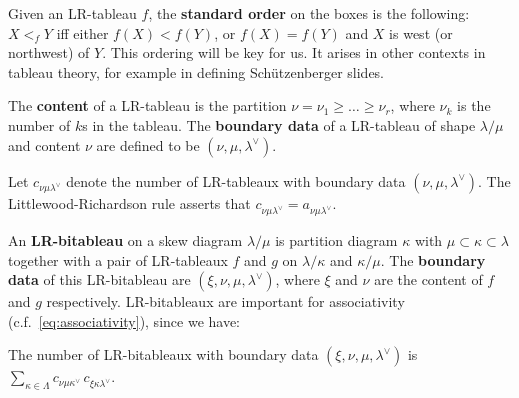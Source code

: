 Given an LR-tableau $f$, the {\bf standard order} on the boxes is the 
following: $X <_f Y$ iff either $f(X) < f(Y)$, or $f(X) = f(Y)$ and $X$
is west (or northwest) of $Y$.  This ordering will be key for us.  It
arises in other contexts in tableau theory, for example in
defining Sch\"utzenberger slides.

The {\bf content} of a LR-tableau is the partition $\nu = \nu_1 \geq \dots 
\geq \nu_r$, where $\nu_k$
is the number of $k$s in the tableau.  The {\bf boundary data} of
a LR-tableau of shape $\lambda/\mu$ and content $\nu$ are defined
to be $(\nu, \mu, \lambda^\vee)$.

Let $c_{\nu \mu \lambda^\vee}$ denote the number of LR-tableaux with
boundary data $(\nu, \mu, \lambda^\vee)$.  
The Littlewood-Richardson rule asserts that 
$c_{\nu \mu \lambda^\vee} = a_{\nu \mu \lambda^\vee}$.

An {\bf LR-bitableau} on a skew diagram $\lambda/\mu$
is partition diagram $\kappa$ with $\mu \subset \kappa \subset \lambda$
together with a pair of LR-tableaux $f$ and $g$ on 
$\lambda/\kappa$ and $\kappa/\mu$.  The {\bf boundary data} of this
LR-bitableau are $(\xi, \nu, \mu, \lambda^\vee)$, where $\xi$ and
$\nu$ are the content of $f$ and $g$ respectively.
LR-bitableaux are important for associativity
(c.f.~\eqref{eq:associativity}), since we have:
\begin{proposition}
\label{prop:countbitableaux}
The number of LR-bitableaux with boundary data 
$(\xi, \nu, \mu, \lambda^\vee)$ is 
$\sum_{\kappa \in \Lambda} c_{\nu \mu \kappa^\vee}\, c_{\xi \kappa \lambda^\vee}$.
\end{proposition}


